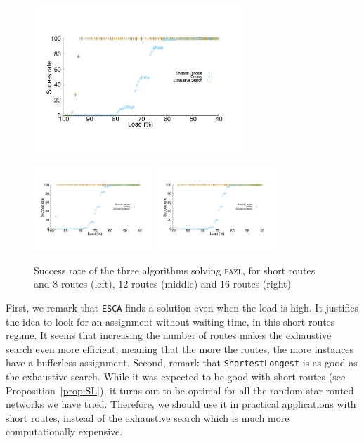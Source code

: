\documentclass[a4paper,10pt]{journal}
\newcommand\shortestlongest{\texttt{ShortestLongest}\xspace}
\newcommand\ESCA{\texttt{ESCA}\xspace}
\newcommand\pazl{\textsc{pazl}\xspace}
\begin{document}
      \begin{figure}[h]
      \begin{center}
	 \includegraphics[width=0.7\textwidth]{pazlshort8.pdf}

	 \includegraphics[width=0.4\textwidth]{pazlshort12.pdf}
	 \includegraphics[width=0.4\textwidth]{pazlshort16.pdf}
      \end{center}
      \caption{Success rate of the three algorithms solving \pazl, for short routes and $8$ routes (left), $12$ routes (middle) and $16$ routes (right)}\label{fig:short}
      \end{figure}

      First, we remark that \ESCA finds a solution even when the load is high. It justifies the idea to look for an assignment without waiting time, in this short routes regime. 
      It seems that increasing the number of routes makes the exhaustive search even more efficient, meaning that the more the routes, the more instances have a bufferless assignment. 
      Second, remark that \shortestlongest is as good as the exhaustive search. While it was expected to be good with short routes (see Proposition~\ref{prop:SL}), it turns out to be optimal for all the random star routed networks we have tried. Therefore, we should use it in practical applications with short routes, instead of the exhaustive search which is much more computationally expensive. 
\end{document}

